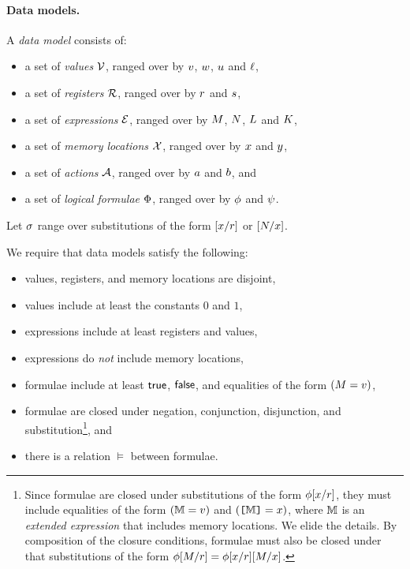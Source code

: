 \paragraph{Data models.}
A \emph{data model} consists of:
\begin{itemize}
\item a set of \emph{values} $\mathcal{V}$, ranged over by
  $v$, $w$, $u$ and $\ell$,
\item a set of \emph{registers} $\mathcal{R}$, ranged over by
  $r$ and $s$,
\item a set of \emph{expressions} $\mathcal{E}$, ranged over by
  $M$, $N$, $L$ and $K$,
\item a set of \emph{memory locations} $\mathcal{X}$, ranged over by $x$ and
  $y$, 
\item a set of \emph{actions} $\mathcal{A}$, ranged over by $a$ and $b$, and
\item a set of \emph{logical formulae} $\Phi$, ranged over by
  $\phi$ and $\psi$.
\end{itemize}

Let $\sigma$ range over substitutions of the form
$[x/r]$ or $[N/x]$.

We require that data models satisfy the following:
\begin{itemize}
\item values, registers, and memory locations are disjoint,
\item values include at least the constants $0$ and $1$,
\item expressions include at least registers and values,
\item expressions do \emph{not} include memory locations, %
\item formulae include at least $\mathsf{true}$, $\mathsf{false}$, and equalities of the form
  $(M=v)$, %
\item formulae are closed under negation, conjunction, disjunction, and
  substitution\footnote{Since formulae are closed under substitutions of the
    form $\phi[x/r]$, they must include equalities of the form
    $(\mathbb{M}=v)$ and $(\texttt{[}\mathbb{M}\texttt{]}=x)$, where $\mathbb{M}$ is an
    \emph{extended expression} that includes memory locations.  We elide the
    details.  By composition of the closure conditions, formulae must also be
    closed under that substitutions of the form
    $\phi[M/r]=\phi[x/r][M/x]$.}, and
\item there is a relation $\vDash$ between formulae.
\end{itemize}

